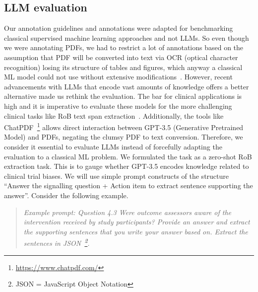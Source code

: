 \documentclass[sn-mathphys,Numbered]{sn-jnl}%
\theoremstyle{thmstyleone}%
\theoremstyle{thmstyletwo}%
\theoremstyle{thmstylethree}%
\begin{document}
\subsection{LLM evaluation}
\label{method:llm}
%
Our annotation guidelines and annotations were adapted for benchmarking classical supervised machine learning approaches and not LLMs.
So even though we were annotating PDFs, we had to restrict a lot of annotations based on the assumption that PDF will be converted into text via OCR (optical character recognition) losing its structure of tables and figures, which anyway a classical ML model could not use without extensive modifications~\cite{li2019figure,li2023uttsr}.
However, recent advancements with LLMs that encode vast amounts of knowledge offers a better alternative made us rethink the evaluation.
The bar for clinical applications is high and it is imperative to evaluate these models for the more challenging clinical tasks like RoB text span extraction~\cite{singhal2023large}.
Additionally, the tools like ChatPDF~\footnote{\url{https://www.chatpdf.com/}} allows direct interaction between GPT-3.5 (Generative Pretrained Model) and PDFs, negating the clumsy PDF to text conversion.
Therefore, we consider it essential to evaluate LLMs instead of forcefully adapting the evaluation to a classical ML problem.
We formulated the task as a zero-shot RoB extraction task.
This is to gauge whether GPT-3.5 encodes knowledge related to clinical trial biases.
We will use simple prompt constructs of the structure ``Answer the signalling question + Action item to extract sentence supporting the answer''. Consider the following example.

\begin{quote}
\itshape Example prompt: Question 4.3 Were outcome assessors aware of the intervention received by study participants? Provide an answer and extract the supporting sentences that you write your answer based on. Extract the sentences in JSON~\footnote{JSON = JavaScript Object Notation}.
\end{quote}
\end{document}
